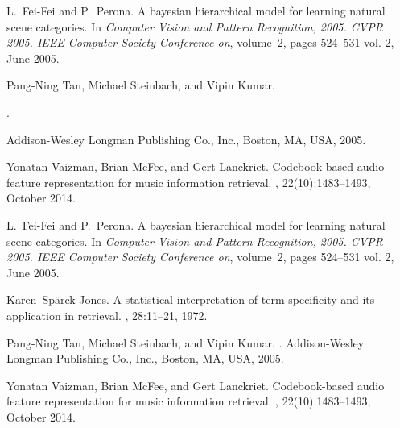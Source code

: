 \documentclass[10pt,letterpaper]{article}
\begin{document}
{%


\begin{thebibliography}{10}


L.~Fei-Fei and P.~Perona.
\newblock A bayesian hierarchical model for learning natural scene categories.
\newblock In {\em Computer Vision and Pattern Recognition, 2005. CVPR 2005.
  IEEE Computer Society Conference on}, volume~2, pages 524--531 vol. 2, June
  2005.



Pang-Ning Tan, Michael Steinbach, and Vipin Kumar.

.

\newblock Addison-Wesley Longman Publishing Co., Inc., Boston, MA, USA, 2005.


Yonatan Vaizman, Brian McFee, and Gert Lanckriet.
\newblock Codebook-based audio feature representation for music information
  retrieval.
,
  22(10):1483--1493, October 2014.




L.~Fei-Fei and P.~Perona.
\newblock A bayesian hierarchical model for learning natural scene categories.
\newblock In {\em Computer Vision and Pattern Recognition, 2005. CVPR 2005.
  IEEE Computer Society Conference on}, volume~2, pages 524--531 vol. 2, June
  2005.


Karen~Spärck Jones.
\newblock A statistical interpretation of term specificity and its application
  in retrieval.
, 28:11--21, 1972.



Pang-Ning Tan, Michael Steinbach, and Vipin Kumar.
.
\newblock Addison-Wesley Longman Publishing Co., Inc., Boston, MA, USA, 2005.





Yonatan Vaizman, Brian McFee, and Gert Lanckriet.
\newblock Codebook-based audio feature representation for music information
  retrieval.
,
  22(10):1483--1493, October 2014.



\end{thebibliography}}
\end{document}
